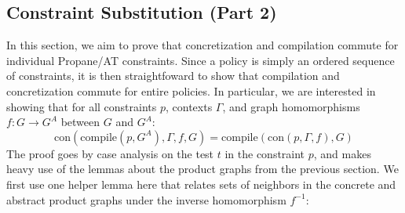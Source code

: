 \documentclass[twocolumn, openany]{sig-alternate-10pt}
\newcommand{\sysname}{{\small \sf Propane/AT}\xspace}
\newcommand{\Con}{\mathrm{con}}
\newcommand{\Compile}{\ensuremath{\mathrm{compile}}}
\begin{document}
\vspace{2em}
\subsection{Constraint Substitution (Part 2)}

In this section, we aim to prove that concretization and compilation commute for individual \sysname constraints. Since a policy is simply an ordered sequence of constraints, it is then straightfoward to show that compilation and concretization commute for entire policies. In particular, we are interested in showing that for all constraints $p$, contexts $\Gamma$, and graph homomorphisms $f: G \rightarrow G^A$ between $G$ and $G^A$:
%
$$\Con(\Compile(p, G^A), \Gamma, f, G) = \Compile(\Con(p,\Gamma,f), G)$$
%
The proof goes by case analysis on the test $t$ in the constraint $p$, and makes heavy use of the lemmas about the product graphs from the previous section. We first use one helper lemma here that relates sets of neighbors in the concrete and abstract product graphs under the inverse homomorphism $f^{-1}$:
\end{document}

